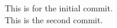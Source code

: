 \documentclass[12pt]{article}
\begin{document}
	This is for the initial commit.	
	\\ This is the second commit.
\end{document}
